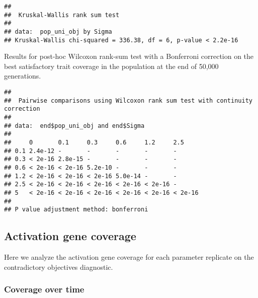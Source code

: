 \documentclass[]{book}
\newenvironment{Shaded}{\begin{snugshade}}{\end{snugshade}}
\newcommand{\DataTypeTok}[1]{\textcolor[rgb]{0.13,0.29,0.53}{#1}}
\newcommand{\KeywordTok}[1]{\textcolor[rgb]{0.13,0.29,0.53}{\textbf{#1}}}
\newcommand{\NormalTok}[1]{#1}
\newcommand{\OperatorTok}[1]{\textcolor[rgb]{0.81,0.36,0.00}{\textbf{#1}}}
\newcommand{\OtherTok}[1]{\textcolor[rgb]{0.56,0.35,0.01}{#1}}
\newcommand{\StringTok}[1]{\textcolor[rgb]{0.31,0.60,0.02}{#1}}
\begin{document}
\begin{verbatim}
## 
##  Kruskal-Wallis rank sum test
## 
## data:  pop_uni_obj by Sigma
## Kruskal-Wallis chi-squared = 336.38, df = 6, p-value < 2.2e-16
\end{verbatim}

Results for post-hoc Wilcoxon rank-sum test with a Bonferroni correction on the best satisfactory trait coverage in the population at the end of 50,000 generations.

\begin{Shaded}
\end{Shaded}

\begin{verbatim}
## 
##  Pairwise comparisons using Wilcoxon rank sum test with continuity correction 
## 
## data:  end$pop_uni_obj and end$Sigma 
## 
##     0       0.1     0.3     0.6     1.2     2.5    
## 0.1 2.4e-12 -       -       -       -       -      
## 0.3 < 2e-16 2.8e-15 -       -       -       -      
## 0.6 < 2e-16 < 2e-16 5.2e-10 -       -       -      
## 1.2 < 2e-16 < 2e-16 < 2e-16 5.0e-14 -       -      
## 2.5 < 2e-16 < 2e-16 < 2e-16 < 2e-16 < 2e-16 -      
## 5   < 2e-16 < 2e-16 < 2e-16 < 2e-16 < 2e-16 < 2e-16
## 
## P value adjustment method: bonferroni
\end{verbatim}

\hypertarget{activation-gene-coverage-8}{%
\subsection{Activation gene coverage}\label{activation-gene-coverage-8}}

Here we analyze the activation gene coverage for each parameter replicate on the contradictory objectives diagnostic.

\hypertarget{coverage-over-time-12}{%
\subsubsection{Coverage over time}\label{coverage-over-time-12}}
\end{document}
